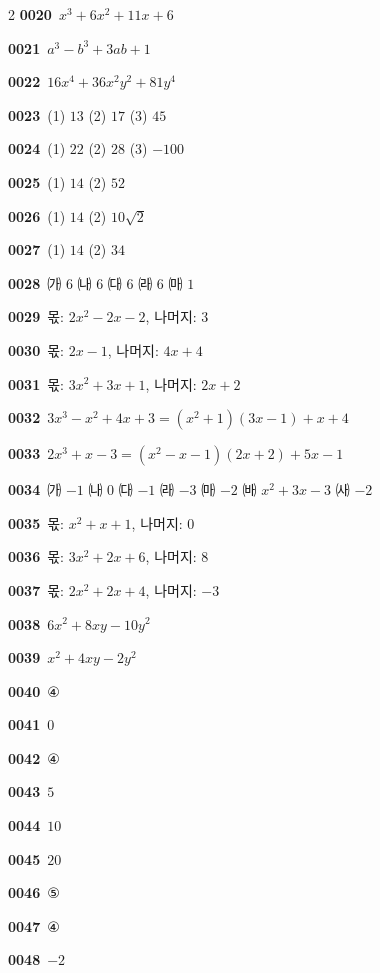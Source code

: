 \documentclass[10pt,a4paper]{article}
\begin{document}
\begin{multicols}{2}
\noindent\textbf{0020}\ $x^3+6x^2+11x+6$\par
\noindent\textbf{0021}\ $a^3-b^3+3ab+1$\par
\noindent\textbf{0022}\ $16x^4+36x^2y^2+81y^4$\par
\noindent\textbf{0023}\ (1) $13$ \quad (2) $17$ \quad (3) $45$\par
\noindent\textbf{0024}\ (1) $22$ \quad (2) $28$ \quad (3) $-100$\par
\noindent\textbf{0025}\ (1) $14$ \quad (2) $52$\par
\noindent\textbf{0026}\ (1) $14$ \quad (2) $10\sqrt{2}$\par
\noindent\textbf{0027}\ (1) $14$ \quad (2) $34$\par
\noindent\textbf{0028}\ ㈎ $6$ \quad ㈏ $6$ \quad ㈐ $6$ \quad ㈑ $6$ \quad ㈒ $1$\par
\noindent\textbf{0029}\ 몫: $2x^2-2x-2$, 나머지: $3$\par
\noindent\textbf{0030}\ 몫: $2x-1$, 나머지: $4x+4$\par
\noindent\textbf{0031}\ 몫: $3x^2+3x+1$, 나머지: $2x+2$\par
\noindent\textbf{0032}\ $3x^3-x^2+4x+3=(x^2+1)(3x-1)+x+4$\par
\noindent\textbf{0033}\ $2x^3+x-3=(x^2-x-1)(2x+2)+5x-1$\par
\noindent\textbf{0034}\ ㈎ $-1$ \quad ㈏ $0$ \quad ㈐ $-1$ \quad ㈑ $-3$ \quad ㈒ $-2$ \quad ㈓ $x^2+3x-3$ \quad ㈔ $-2$\par
\noindent\textbf{0035}\ 몫: $x^2+x+1$, 나머지: $0$\par
\noindent\textbf{0036}\ 몫: $3x^2+2x+6$, 나머지: $8$\par
\noindent\textbf{0037}\ 몫: $2x^2+2x+4$, 나머지: $-3$\par
\noindent\textbf{0038}\ $6x^2+8xy-10y^2$\par
\noindent\textbf{0039}\ $x^2+4xy-2y^2$\par
\noindent\textbf{0040}\ ④\par
\noindent\textbf{0041}\ $0$\par
\noindent\textbf{0042}\ ④\par
\noindent\textbf{0043}\ $5$\par
\noindent\textbf{0044}\ $10$\par
\noindent\textbf{0045}\ $20$\par
\noindent\textbf{0046}\ ⑤\par
\noindent\textbf{0047}\ ④\par
\noindent\textbf{0048}\ $-2$\par

\end{multicols}
\end{document}

